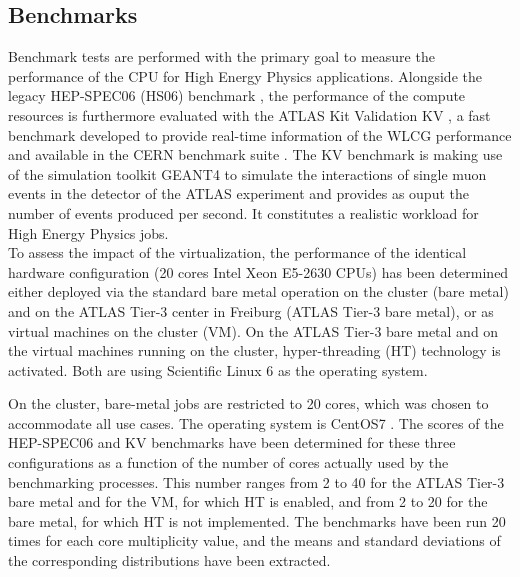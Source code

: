 \subsection{Benchmarks}
Benchmark tests are performed with the primary goal to measure the performance of the CPU for High Energy Physics applications. 
Alongside the legacy HEP-SPEC06 (HS06) benchmark \cite{Hepspec}, the performance of the compute resources is furthermore evaluated with the ATLAS Kit Validation
KV \cite{DeSalvo:2010zza}, a fast benchmark developed to provide real-time information of the WLCG performance and available in the CERN benchmark suite \cite{Alef:2017jyx}.
The KV benchmark is making use of the simulation toolkit GEANT4 \cite{Agostinelli:2002hh} to simulate the interactions of single muon events in the detector of the ATLAS experiment
and provides as ouput the number of events produced per second. It constitutes a realistic workload for High Energy Physics jobs. \\

To assess the impact of the virtualization, the performance of the identical hardware configuration (20 cores Intel Xeon E5-2630 CPUs) has been determined either deployed via
the standard bare metal operation on the \NEMO cluster (\NEMO bare metal) and on the ATLAS Tier-3 center in Freiburg (ATLAS Tier-3 bare metal), or as virtual machines on the
\NEMO cluster (\NEMO VM). On the ATLAS Tier-3 bare metal and on the virtual machines running on the \NEMO cluster, hyper-threading (HT) technology is activated. Both are using Scientific
Linux 6 \cite{SL6} as the operating system.

On the \NEMO cluster, bare-metal jobs are restricted to 20 cores, which was chosen to accommodate all use cases. The operating system is CentOS7 \cite{CentOS7}.
The scores of the HEP-SPEC06 and KV benchmarks have been determined for these three configurations as a function of the number of cores actually used by the benchmarking processes.
This number ranges from 2 to 40 for the ATLAS Tier-3 bare metal and for the \NEMO VM, for which HT is enabled, and from 2 to 20 for the \NEMO bare metal, for which HT is not implemented.
The benchmarks have been run 20 times for each core multiplicity value, and the means and standard deviations of the corresponding distributions have been extracted. \\

